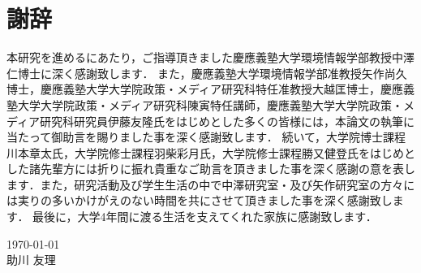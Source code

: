 \chapter*{謝辞}
本研究を進めるにあたり，ご指導頂きました慶應義塾大学環境情報学部教授中澤仁博士に深く感謝致します．
また，慶應義塾大学環境情報学部准教授矢作尚久博士，慶應義塾大学大学院政策・メディア研究科特任准教授大越匡博士，慶應義塾大学大学院政策・メディア研究科陳寅特任講師，慶應義塾大学大学院政策・メディア研究科研究員伊藤友隆氏をはじめとした多くの皆様には，本論文の執筆に当たって御助言を賜りました事を深く感謝致します．
続いて，大学院博士課程川本章太氏，大学院修士課程羽柴彩月氏，大学院修士課程勝又健登氏をはじめとした諸先輩方には折りに振れ貴重なご助言を頂きました事を深く感謝の意を表します．また，研究活動及び学生生活の中で中澤研究室・及び矢作研究室の方々には実りの多いかけがえのない時間を共にさせて頂きました事を深く感謝致します．
最後に，大学4年間に渡る生活を支えてくれた家族に感謝致します．

\begin{flushright}
\today\\
助川 友理
\end{flushright}